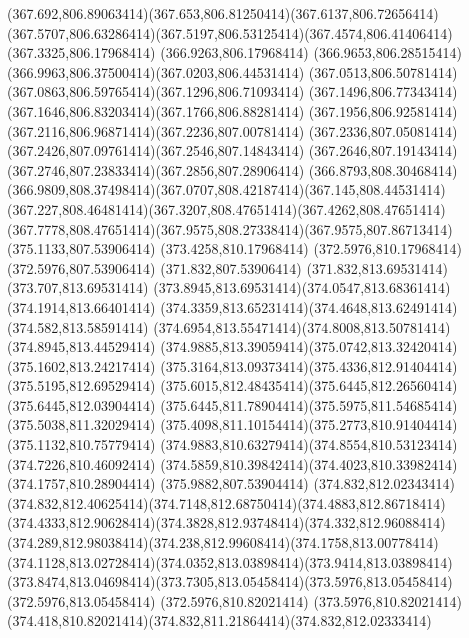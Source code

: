 {{	\curveto(367.692,806.89063414)(367.653,806.81250414)(367.6137,806.72656414)
	\curveto(367.5707,806.63286414)(367.5197,806.53125414)(367.4574,806.41406414)
	\lineto(367.3325,806.17968414)
	\lineto(366.9263,806.17968414)
	\curveto(366.9653,806.28515414)(366.9963,806.37500414)(367.0203,806.44531414)
	\curveto(367.0513,806.50781414)(367.0863,806.59765414)(367.1296,806.71093414)
	\curveto(367.1496,806.77343414)(367.1646,806.83203414)(367.1766,806.88281414)
	\curveto(367.1956,806.92581414)(367.2116,806.96871414)(367.2236,807.00781414)
	\curveto(367.2336,807.05081414)(367.2426,807.09761414)(367.2546,807.14843414)
	\curveto(367.2646,807.19143414)(367.2746,807.23833414)(367.2856,807.28906414)
	\lineto(366.8793,808.30468414)
	\curveto(366.9809,808.37498414)(367.0707,808.42187414)(367.145,808.44531414)
	\curveto(367.227,808.46481414)(367.3207,808.47651414)(367.4262,808.47651414)
	\curveto(367.7778,808.47651414)(367.9575,808.27338414)(367.9575,807.86713414)
	\closepath
	\moveto(375.1133,807.53906414)
	\lineto(373.4258,810.17968414)
	\lineto(372.5976,810.17968414)
	\lineto(372.5976,807.53906414)
	\lineto(371.832,807.53906414)
	\lineto(371.832,813.69531414)
	\lineto(373.707,813.69531414)
	\curveto(373.8945,813.69531414)(374.0547,813.68361414)(374.1914,813.66401414)
	\curveto(374.3359,813.65231414)(374.4648,813.62491414)(374.582,813.58591414)
	\curveto(374.6954,813.55471414)(374.8008,813.50781414)(374.8945,813.44529414)
	\curveto(374.9885,813.39059414)(375.0742,813.32420414)(375.1602,813.24217414)
	\curveto(375.3164,813.09373414)(375.4336,812.91404414)(375.5195,812.69529414)
	\curveto(375.6015,812.48435414)(375.6445,812.26560414)(375.6445,812.03904414)
	\curveto(375.6445,811.78904414)(375.5975,811.54685414)(375.5038,811.32029414)
	\curveto(375.4098,811.10154414)(375.2773,810.91404414)(375.1132,810.75779414)
	\curveto(374.9883,810.63279414)(374.8554,810.53123414)(374.7226,810.46092414)
	\curveto(374.5859,810.39842414)(374.4023,810.33982414)(374.1757,810.28904414)
	\lineto(375.9882,807.53904414)
	\closepath
	\moveto(374.832,812.02343414)
	\curveto(374.832,812.40625414)(374.7148,812.68750414)(374.4883,812.86718414)
	\curveto(374.4333,812.90628414)(374.3828,812.93748414)(374.332,812.96088414)
	\curveto(374.289,812.98038414)(374.238,812.99608414)(374.1758,813.00778414)
	\curveto(374.1128,813.02728414)(374.0352,813.03898414)(373.9414,813.03898414)
	\curveto(373.8474,813.04698414)(373.7305,813.05458414)(373.5976,813.05458414)
	\lineto(372.5976,813.05458414)
	\lineto(372.5976,810.82021414)
	\lineto(373.5976,810.82021414)
	\curveto(374.418,810.82021414)(374.832,811.21864414)(374.832,812.02333414)
}}

